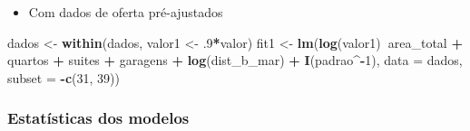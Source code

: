 \documentclass{article}
\newenvironment{Shaded}{\begin{snugshade}}{\end{snugshade}}
\newcommand{\DataTypeTok}[1]{\textcolor[rgb]{0.13,0.29,0.53}{#1}}
\newcommand{\DecValTok}[1]{\textcolor[rgb]{0.00,0.00,0.81}{#1}}
\newcommand{\FloatTok}[1]{\textcolor[rgb]{0.00,0.00,0.81}{#1}}
\newcommand{\KeywordTok}[1]{\textcolor[rgb]{0.13,0.29,0.53}{\textbf{#1}}}
\newcommand{\NormalTok}[1]{#1}
\newcommand{\OperatorTok}[1]{\textcolor[rgb]{0.81,0.36,0.00}{\textbf{#1}}}
\newcommand{\StringTok}[1]{\textcolor[rgb]{0.31,0.60,0.02}{#1}}
\begin{document}
\begin{itemize}
\tightlist
\item
  Com dados de oferta pré-ajustados
\end{itemize}

\begin{Shaded}
\begin{Highlighting}[]
\NormalTok{dados <-}\StringTok{ }\KeywordTok{within}\NormalTok{(dados, valor1 <-}\StringTok{ }\FloatTok{.9}\OperatorTok{*}\NormalTok{valor)}
\NormalTok{fit1 <-}\StringTok{ }\KeywordTok{lm}\NormalTok{(}\KeywordTok{log}\NormalTok{(valor1)}\OperatorTok{~}\NormalTok{area_total }\OperatorTok{+}\StringTok{ }\NormalTok{quartos }\OperatorTok{+}\StringTok{ }\NormalTok{suites }\OperatorTok{+}\StringTok{ }\NormalTok{garagens }\OperatorTok{+}\StringTok{ }
\StringTok{            }\KeywordTok{log}\NormalTok{(dist_b_mar) }\OperatorTok{+}\StringTok{ }\KeywordTok{I}\NormalTok{(padrao}\OperatorTok{^-}\DecValTok{1}\NormalTok{), }\DataTypeTok{data =}\NormalTok{ dados, }\DataTypeTok{subset =} \OperatorTok{-}\KeywordTok{c}\NormalTok{(}\DecValTok{31}\NormalTok{, }\DecValTok{39}\NormalTok{))}
\end{Highlighting}
\end{Shaded}

\hypertarget{estatuxedsticas-dos-modelos}{%
\subsubsection{Estatísticas dos
modelos}\label{estatuxedsticas-dos-modelos}}
\end{document}
